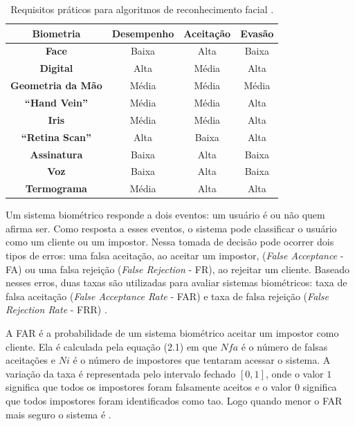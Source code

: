 	\begin{table}[htb]
		\begin{center}
			\caption{Requisitos práticos para algoritmos de reconhecimento facial \cite{milene}.}
			\begin{tabular}{|c|c|c|c|}
				\hline \bf Biometria & \bf Desempenho & \bf Aceitação & \bf Evasão \\
				\hline \hline \bf Face & Baixa & Alta & Baixa\\
				\hline \bf Digital & Alta & Média &  Alta\\
				\hline \bf Geometria da Mão & Média & Média & Média\\
				\hline \bf ``Hand Vein'' & Média & Média & Alta\\
				\hline \bf Iris  & Média & Média & Alta\\
				\hline \bf ``Retina Scan'' & Alta & Baixa & Alta\\
				\hline \bf Assinatura & Baixa & Alta & Baixa \\
				\hline \bf Voz & Baixa & Alta & Baixa \\
				\hline \bf Termograma & Média & Alta & Alta \\
				\hline
			\end{tabular}
		\end{center}
		\label{tabelaRequisitosPraticos}
	\end{table}

Um sistema biométrico responde a dois eventos: um usuário é ou não quem afirma ser. Como resposta a esses eventos, o sistema pode classificar o usuário como um cliente ou um impostor. Nessa tomada de decisão pode ocorrer dois tipos de erros: uma falsa aceitação, ao aceitar um impostor, (\textit{False Acceptance} - FA) ou uma falsa rejeição (\textit{False Rejection} - FR), ao rejeitar um cliente. Baseado nesses erros, duas taxas são utilizadas para avaliar sistemas biométricos: taxa de falsa aceitação (\textit{False Acceptance Rate} - FAR) e taxa de falsa rejeição (\textit{False Rejection Rate} - FRR) \cite{drovetto}.

A FAR é a probabilidade de um sistema biométrico aceitar um impostor como cliente. Ela é calculada pela equação (2.1) em que $\displaystyle Nfa$ é o número de falsas aceitações e $\displaystyle Ni$ é o número de impostores que tentaram acessar o sistema. A variação da taxa é representada pelo intervalo fechado $\displaystyle [0,1]$, onde o valor $\displaystyle 1$ significa que todos os impostores foram falsamente aceitos e o valor $\displaystyle 0$ significa que todos impostores foram identificados como tao. Logo quando menor o FAR mais seguro o sistema é \cite{drovetto}.

